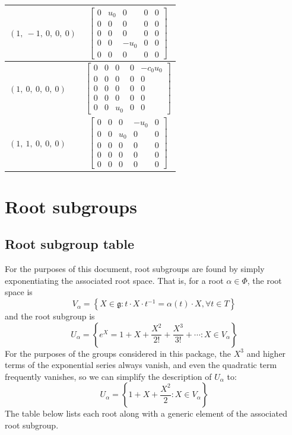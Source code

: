 \documentclass[11pt]{article}
\newcommand{\noi}{\noindent}
\newcommand{\inv}{^{-1}}
\newcommand{\lb}{\left\{}
\newcommand{\rb}{\right\}}
\newcommand{\frakg}{\mathfrak{g}}
\theoremstyle{definition}
\begin{document}
\begin{longtable}{|l|c|}
    \hline
    $\left( 1, \  -1, \  0, \  0, \  0\right)$ & ${\left[\begin{matrix}0 & u_{0} & 0 & 0 & 0\\0 & 0 & 0 & 0 & 0\\0 & 0 & 0 & 0 & 0\\0 & 0 & - u_{0} & 0 & 0\\0 & 0 & 0 & 0 & 0\end{matrix}\right]}$ \\
    \hline
    $\left( 1, \  0, \  0, \  0, \  0\right)$ & ${\left[\begin{matrix}0 & 0 & 0 & 0 & - c_{0} u_{0}\\0 & 0 & 0 & 0 & 0\\0 & 0 & 0 & 0 & 0\\0 & 0 & 0 & 0 & 0\\0 & 0 & u_{0} & 0 & 0\end{matrix}\right]}$ \\
    \hline
    $\left( 1, \  1, \  0, \  0, \  0\right)$ & ${\left[\begin{matrix}0 & 0 & 0 & - u_{0} & 0\\0 & 0 & u_{0} & 0 & 0\\0 & 0 & 0 & 0 & 0\\0 & 0 & 0 & 0 & 0\\0 & 0 & 0 & 0 & 0\end{matrix}\right]}$ \\
    \hline
\end{longtable}


\newpage
\section{Root subgroups}

\subsection{Root subgroup table}

\noi For the purposes of this document, root subgroups are found by simply exponentiating the associated root space. That is, for a root $\alpha \in \Phi$, the root space is
\[
	V_\alpha = \lb X \in \frakg : t \cdot X \cdot t \inv = \alpha(t) \cdot X, \forall t \in T \rb
\]
and the root subgroup is
\[
	U_\alpha = \lb e^X = 1 + X + \frac{X^2}{2!} + \frac{X^3}{3!} + \cdots : X \in V_\alpha \rb
\]
For the purposes of the groups considered in this package, the $X^3$ and higher terms of the exponential series always vanish, and even the quadratic term frequently vanishes, so we can simplify the description of $U_\alpha$ to:
\[
	U_\alpha = \lb 1 + X + \frac{X^2}{2} : X \in V_\alpha \rb
\]
The table below lists each root along with a generic element of the associated root subgroup.
\end{document}
